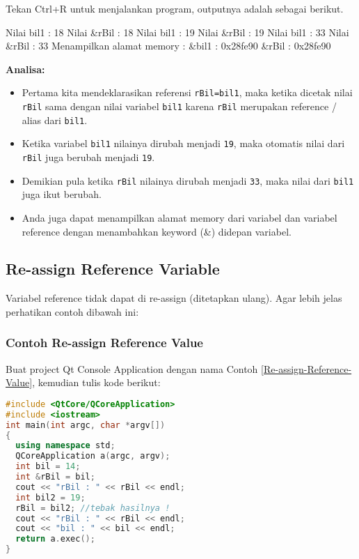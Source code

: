 Tekan Ctrl+R untuk menjalankan program, outputnya adalah sebagai
berikut.

\begin{lcverbatim}
Nilai bil1 : 18
Nilai &rBil : 18
Nilai bil1 : 19
Nilai &rBil : 19
Nilai bil1 : 33
Nilai &rBil : 33
Menampilkan alamat memory :
&bil1 : 0x28fe90
&rBil : 0x28fe90
\end{lcverbatim}

\textbf{Analisa:}

\begin{itemize}

\item
  Pertama kita mendeklarasikan referensi \texttt{rBil=bil1}, maka ketika
  dicetak nilai \texttt{rBil} sama dengan nilai variabel \texttt{bil1}
  karena \texttt{rBil} merupakan reference / alias dari \texttt{bil1}.
\item
  Ketika variabel \texttt{bil1} nilainya dirubah menjadi \texttt{19},
  maka otomatis nilai dari \texttt{rBil} juga berubah menjadi
  \texttt{19}.
\item
  Demikian pula ketika \texttt{rBil} nilainya dirubah menjadi
  \texttt{33}, maka nilai dari \texttt{bil1} juga ikut berubah.
\item
  Anda juga dapat menampilkan alamat memory dari variabel dan variabel
  reference dengan menambahkan keyword (\&) didepan variabel.
\end{itemize}

\subsection{Re-assign Reference
Variable}\label{re-assign-reference-variable}

Variabel reference tidak dapat di re-assign (ditetapkan ulang). Agar
lebih jelas perhatikan contoh dibawah ini:

\subsubsection*{Contoh  Re-assign Reference Value}

Buat project Qt Console Application dengan nama Contoh \ref{Re-assign-Reference-Value}, kemudian tulis
kode berikut:

\begin{lstlisting}[language=c++, caption=Re-assign Reference Value, label=Re-assign-Reference-Value]
#include <QtCore/QCoreApplication>
#include <iostream>
int main(int argc, char *argv[])
{
  using namespace std;
  QCoreApplication a(argc, argv);
  int bil = 14;
  int &rBil = bil;
  cout << "rBil : " << rBil << endl;
  int bil2 = 19;
  rBil = bil2; //tebak hasilnya !
  cout << "rBil : " << rBil << endl;
  cout << "bil : " << bil << endl;
  return a.exec();
}
\end{lstlisting}

